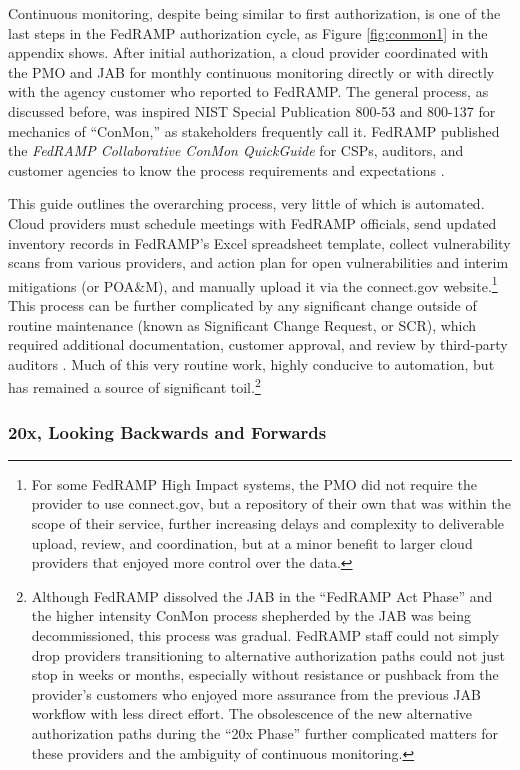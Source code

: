 \documentclass{jdf}
\begin{document}
Continuous monitoring, despite being similar to first authorization, is one of the last steps in the FedRAMP authorization cycle, as Figure \ref{fig:conmon1} in the appendix shows. After initial authorization, a cloud provider coordinated with the PMO and JAB for monthly continuous monitoring directly or with directly with the agency customer who reported to FedRAMP. The general process, as discussed before, was inspired NIST Special Publication 800-53 and 800-137 for mechanics of ``ConMon,'' as stakeholders frequently call it. FedRAMP published the \textit{FedRAMP Collaborative ConMon QuickGuide} for CSPs, auditors, and customer agencies to know the process requirements and expectations \citeyear{fedramp_cmqg23}.

This guide outlines the overarching process, very little of which is automated. Cloud providers must schedule meetings with FedRAMP officials, send updated inventory records in FedRAMP's Excel spreadsheet template, collect vulnerability scans from various providers, and action plan for open vulnerabilities and interim mitigations (or POA\&M), and manually upload it via the connect.gov website.\footnote{For some FedRAMP High Impact systems, the PMO did not require the provider to use connect.gov, but a repository of their own that was within the scope of their service, further increasing delays and complexity to deliverable upload, review, and coordination, but at a minor benefit to larger cloud providers that enjoyed more control over the data.} This process can be further complicated by any significant change outside of routine maintenance (known as Significant Change Request, or SCR), which required additional documentation, customer approval, and review by third-party auditors \cite{fedramp_cmqg23}. Much of this very routine work, highly conducive to automation, but has remained a source of significant toil.\footnote{Although FedRAMP dissolved the JAB in the ``FedRAMP Act Phase'' and the higher intensity ConMon process shepherded by the JAB was being decommissioned, this process was gradual. FedRAMP staff could not simply drop providers transitioning to alternative authorization paths could not just stop in weeks or months, especially without resistance or pushback from the provider's customers who enjoyed more assurance from the previous JAB workflow with less direct effort. The obsolescence of the new alternative authorization paths during the ``20x Phase'' further complicated matters for these providers and the ambiguity of continuous monitoring.}

\subsubsection{20x, Looking Backwards and Forwards} \label{20x}
\end{document}
